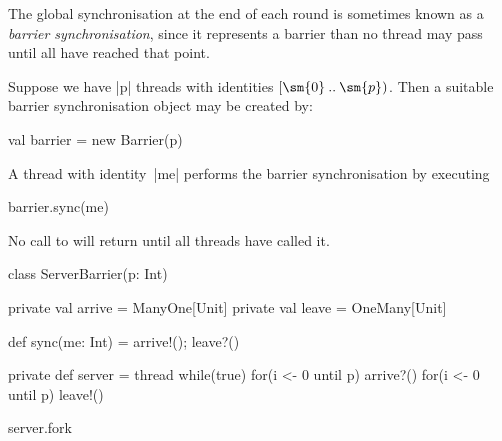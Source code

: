 
\begin{slide}

The global synchronisation at the end of each round is sometimes known as a
\emph{barrier synchronisation}, since it represents a barrier than no thread
may pass until all have reached that point.

Suppose we have |p| threads with identities $[\sm{0} \mathbin{..} \sm{p})$.
  Then a suitable barrier synchronisation object may be created by:
%
\begin{scala}
val barrier = new Barrier(p)
\end{scala}
%

A thread with identity~|me| performs the barrier synchronisation by executing
%
\begin{scala}
barrier.sync(me)
\end{scala}
%
No call to  will return until all  threads have called
it. 
\end{slide}


\begin{slide}

\begin{scala}
class ServerBarrier(p: Int){
  private val arrive = ManyOne[Unit]
  private val leave = OneMany[Unit]

  def sync(me: Int) = { arrive!(); leave?() }

  private def server = thread{
    while(true){
      for(i <- 0 until p) arrive?()
      for(i <- 0 until p) leave!()
    }
  }

  server.fork
}
\end{scala}
\end{slide}







